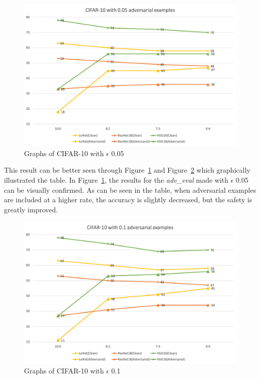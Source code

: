 \documentclass[journal,article,submit,moreauthors,pdftex]{Definitions/mdpi}
\begin{document}
\begin{figure}[H]
    \includegraphics[width=13 cm]{Definitions/graph-005cifar10.png}
    \caption{Graphs of CIFAR-10 with \begin{math}\epsilon\end{math} 0.05\label{cifar10-0.05-graph}}
\end{figure}

This result can be better seen through Figure~\ref{cifar10-0.05-graph} and Figure~\ref{cifar10-0.1-graph} which graphically illustrated the table.
In Figure~\ref{cifar10-0.05-graph}, the results for the {\it adv\_eval} made with \begin{math}\epsilon\end{math} 0.05 can be visually confirmed.
As can be seen in the table, when adversarial examples are included at a higher rate, the accuracy is slightly decreased, but the safety is greatly improved.

\begin{figure}[H]
    \includegraphics[width=13 cm]{Definitions/graph-01cifar10.png}
    \caption{Graphs of CIFAR-10 with \begin{math}\epsilon\end{math} 0.1\label{cifar10-0.1-graph}}
\end{figure}
\end{document}
